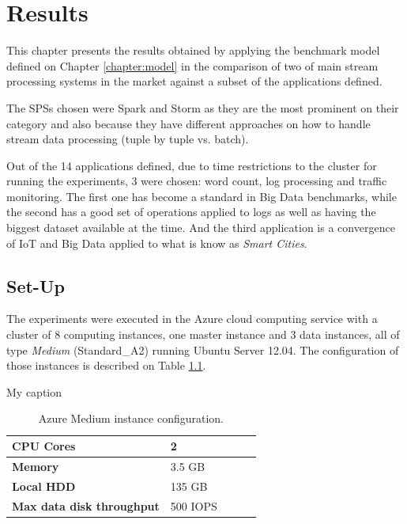 \documentclass[ppgc,diss,english]{iiufrgs}
\begin{document}
\chapter{Results}
\label{chapter:results}

This chapter presents the results obtained by applying the benchmark model defined on Chapter \ref{chapter:model} in the comparison of two of main stream processing systems in the market against a subset of the applications defined.

The SPSs chosen were Spark and Storm as they are the most prominent on their category and also because they have different approaches on how to handle stream data processing (tuple by tuple vs. batch).

Out of the 14 applications defined, due to time restrictions to the cluster for running the experiments, 3 were chosen: word count, log processing and traffic monitoring. The first one has become a standard in Big Data benchmarks, while the second has a good set of operations applied to logs as well as having the biggest dataset available at the time. And the third application is a convergence of IoT and Big Data applied to what is know as \textit{Smart Cities}.

\section{Set-Up}
\label{sec:set-up}

The experiments were executed in the Azure cloud computing service with a cluster of 8 computing instances, one master instance and 3 data instances, all of type \textit{Medium} (Standard\_A2) running Ubuntu Server 12.04. The configuration of those instances is described on Table \ref{table:azure_medium_config}.

\begin{table}[h]
\centering
\caption{My caption}
\label{my-label}
\begin{tabular}{lllll}
\hline
\textbf{CPU Cores}                & 2        &  &  &  \\ \hline
\textbf{Memory}                   & 3.5 GB   &  &  &  \\ \hline
\textbf{Local HDD}                & 135 GB   &  &  &  \\ \hline
\textbf{Max data disk throughput} & 500 IOPS &  &  &  \\ \hline
\end{tabular}
\caption{Azure Medium instance configuration.}
	\label{table:azure_medium_config}
\end{table}
\end{document}
